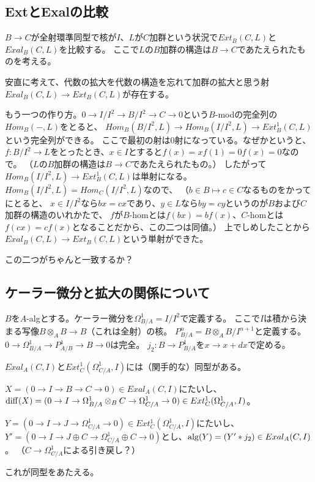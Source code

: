 \documentclass{jsarticle}
\begin{document}
\subsection{ExtとExalの比較}

$B\to C$が全射環準同型で核が$I$、$L$が$C$加群という状況で$Ext_B(C, L)$と$Exal_B(C, L)$を比較する。
ここで$L$の$B$加群の構造は$B\to C$であたえられたものを考える。

安直に考えて、代数の拡大を代数の構造を忘れて加群の拡大と思う射$Exal_B(C, L)\to Ext_B(C, L)$が存在する。

もう一つの作り方。$0 \to I/I^2 \to B/I^2 \to C \to0$という$B$-modの完全列の$Hom_B(-,L)$をとると、
$Hom_B(B/I^2, L)\to Hom_B(I/I^2, L) \to Ext_B^1(C, L)$という完全列ができる。
ここで最初の射は$0$射になっている。なぜかというと、$f: B/I^2 \to L$をとったとき、$x\in I$とすると$f(x)=xf(1)=0f(x)=0$なので。
（$L$の$B$加群の構造は$B\to C$であたえられたもの。）
したがって$Hom_B(I/I^2, L) \to Ext_B^1(C, L)$は単射になる。
$Hom_B(I/I^2, L)=Hom_C(I/I^2, L)$なので、
（$b\in B \mapsto c\in C$なるものをかってにとると、
$x \in I/I^2$なら$bx=cx$であり、$y\in L$なら$by=cy$というのが$B$および$C$加群の構造のいれかたで、
$f$が$B$-homとは$f(bx)=bf(x)$、$C$-homとは$f(cx)=cf(x)$となることだから、この二つは同値。）
上でしめしたことから$Exal_B(C, L)\to Ext_B(C, L)$という単射ができた。

この二つがちゃんと一致するか？

\subsection{ケーラー微分と拡大の関係について}
\begin{dfn}
$B$を$A$-algとする。ケーラー微分を$\Omega^1_{B/A} = I/I^2$で定義する。
ここで$I$は積から決まる写像$B\otimes_A B \to B$（これは全射）の核。
$P^n_{B/A} = B\otimes_A B/I^{n+1}$と定義する。
$0 \to \Omega^1_{B/A} \to P^1_{A/B} \to B \to 0$は完全。
$j_2:B \to P^1_{B/A}$を$x \to x+dx$で定める。
\end{dfn}


\begin{prop}
$Exal_A(C, I)$と$Ext^1_C(\Omega^1_{C/A}, I)$には（関手的な）同型がある。

$X = (0 \to I \to B \to C \to 0) \in Exal_A(C, I)$にたいし、
${\rm diff}(X) = (0 \to I \to \Omega^1_{B/A}\otimes_B C \to \Omega^1_{C/A} \to 0) \in Ext^1_C(\Omega^1_{C/A}, I)$。

$Y = (0 \to I \to J \to \Omega^1_{C/A} \to 0) \in Ext^1_C(\Omega^1_{C/A}, I)$にたいし、
$Y' = (0 \to I \to J\oplus C \to \Omega^1_{C/A}\oplus C \to 0)$とし、${\rm alg}(Y) = (Y'*j_2) \in Exal_A(C, I)$。
（$C\to \Omega^1_{C/A}$による引き戻し？）

これが同型をあたえる。
\end{prop}
\end{document}
